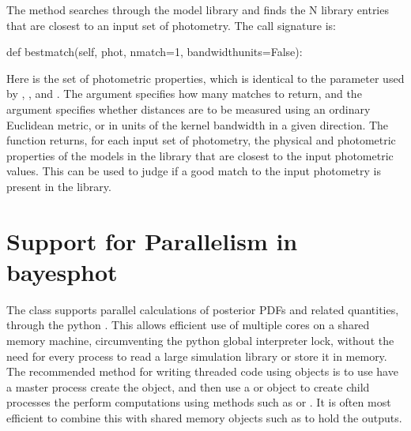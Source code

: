 \documentclass[letterpaper,10pt,english]{sphinxmanual}
\begin{document}
The  method searches through the model library and finds the N library entries that are closest to an input set of photometry. The call signature is:

\begin{sphinxVerbatim}[commandchars=\\\{\}]
def bestmatch(self, phot, nmatch=1, bandwidth\PYGZus{}units=False):
\end{sphinxVerbatim}

Here  is the set of photometric properties, which is identical to the  parameter used by , , and . The argument  specifies how many matches to return, and the argument  specifies whether distances are to be measured using an ordinary Euclidean metric, or in units of the kernel bandwidth in a given direction. The function returns, for each input set of photometry, the physical and photometric properties of the  models in the library that are closest to the input photometric values. This can be used to judge if a good match to the input photometry is present in the library.


\section{Support for Parallelism in bayesphot}
\label{\detokenize{bayesphot:ssec-bayesphot-threading}}\label{\detokenize{bayesphot:support-for-parallelism-in-bayesphot}}
The  class supports parallel calculations of posterior PDFs and
related quantities, through the python . This
allows efficient use of multiple cores on a shared memory machine,
circumventing the python global interpreter lock, without the need for
every process to read a large simulation library or store it in
memory. The recommended method for writing threaded code using 
objects is to use have a master process create the  object, and
then use a 
or 
object to create child processes the perform computations using 
methods such as  or . It is often most efficient
to combine this with shared memory objects such as 
to hold the outputs.
\end{document}
